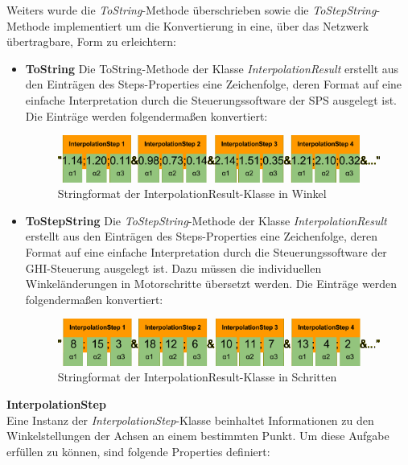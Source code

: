 Weiters wurde die \textit{ToString}-Methode überschrieben sowie die \textit{ToStepString}-Methode implementiert um die Konvertierung in eine, über das Netzwerk übertragbare, Form zu erleichtern:
\begin{itemize}
\item \textbf{ToString}
Die ToString-Methode der Klasse \textit{InterpolationResult} erstellt aus den Einträgen des Steps-Properties eine Zeichenfolge, deren Format auf eine einfache Interpretation durch die Steuerungssoftware der SPS ausgelegt ist. Die Einträge werden folgendermaßen konvertiert:\\
\begin{figure}[H]
  \centering
  \begin{minipage}[t]{12 cm}
  	\centering
  	\includegraphics[width=12cm]{images/InterpolationResult} 
    \caption{Stringformat der InterpolationResult-Klasse in Winkel}
  \end{minipage}
\end{figure}
\newpage
\item \textbf{ToStepString}
Die \textit{ToStepString}-Methode der Klasse \textit{InterpolationResult} erstellt aus den Einträgen des Steps-Properties eine Zeichenfolge, deren Format auf eine einfache Interpretation durch die Steuerungssoftware der GHI-Steuerung ausgelegt ist. Dazu müssen die individuellen Winkeländerungen in Motorschritte übersetzt werden. Die Einträge werden folgendermaßen konvertiert:\\
\begin{figure}[H]
  \centering
  \begin{minipage}[t]{12 cm}
  	\centering
  	\includegraphics[width=12cm]{images/InterpolationResult2} 
    \caption{Stringformat der InterpolationResult-Klasse in Schritten}
  \end{minipage}
\end{figure}
\end{itemize}
\textbf{InterpolationStep}\\
Eine Instanz der \textit{InterpolationStep}-Klasse beinhaltet Informationen zu den Winkelstellungen der Achsen an einem bestimmten Punkt. Um diese Aufgabe erfüllen zu können, sind folgende Properties definiert:
